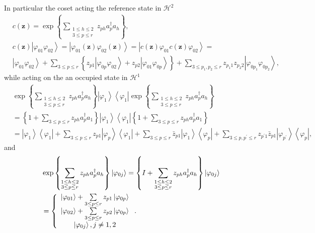 \documentclass[aps,preprint]{revtex4}%
\begin{document}
In particular the coset acting the reference state in $\mathcal{H}^{2}$
\begin{align}
&  c\left(  \mathbf{z}\right)  =\exp\left\{  \sum\limits_{\substack{1\leq
h\leq2\\3\leq p\leq r}}z_{ph}a_{p}^{\dagger}a_{h}\right\}  ,\nonumber\\
&  c\left(  \mathbf{z}\right)  \left\vert \varphi_{01}\varphi_{02}%
\right\rangle =\left\vert \varphi_{01}\left(  \mathbf{z}\right)  \varphi
_{02}\left(  \mathbf{z}\right)  \right\rangle =\left\vert c\left(
\mathbf{z}\right)  \varphi_{01}c\left(  \mathbf{z}\right)  \varphi
_{02}\right\rangle =\nonumber\\
&  \left\vert \varphi_{01}\varphi_{02}\right\rangle +\sum\limits_{3\leq p\leq
r}\left\{  z_{p1}\left\vert \varphi_{0p}\varphi_{02}\right\rangle
+z_{p2}\left\vert \varphi_{01}\varphi_{0p}\right\rangle \right\}
+\sum\limits_{3\leq p_{1},p_{2}\leq r}z_{p_{1}1}z_{p_{2}2}\left\vert
\varphi_{0p_{1}}\varphi_{0p_{2}}\right\rangle ,
\end{align}
while acting on the an occupied state in $\mathcal{H}^{1}$
\begin{align}
&  \exp\left\{  \sum\limits_{\substack{1\leq h\leq2\\3\leq p\leq r}%
}z_{ph}a_{p}^{\dagger}a_{h}\right\}  \left\vert \varphi_{1}\right\rangle
\left\langle \varphi_{1}\right\vert \exp\left\{  \sum\limits_{\substack{1\leq
h\leq2\\3\leq p\leq r}}z_{ph}a_{p}^{\dagger}a_{h}\right\}  \nonumber\\
&  =\left\{  1+\sum\limits_{3\leq p\leq r}z_{ph}a_{p}^{\dagger}a_{1}\right\}
\left\vert \varphi_{1}\right\rangle \left\langle \varphi_{1}\right\vert
\left\{  1+\sum\limits_{3\leq p\leq r}z_{ph}a_{p}^{\dagger}a_{1}\right\}
\nonumber\\
&  =\left\vert \varphi_{1}\right\rangle \left\langle \varphi_{1}\right\vert
+\sum\limits_{3\leq p\leq r}z_{p1}\left\vert \varphi_{p}\right\rangle
\left\langle \varphi_{1}\right\vert +\sum\limits_{3\leq p\leq r}\bar{z}%
_{p1}\left\vert \varphi_{1}\right\rangle \left\langle \varphi_{p}\right\vert
+\sum\limits_{3\leq p,p^{\prime}\leq r}z_{p^{\prime}1}\bar{z}_{p1}\left\vert
\varphi_{p^{\prime}}\right\rangle \left\langle \varphi_{p}\right\vert ,
\end{align}
and
\begin{align}
&  \exp\left\{  \sum\limits_{\substack{1\leq h\leq2\\3\leq p\leq r}%
}z_{ph}a_{p}^{\dagger}a_{h}\right\}  \left\vert \varphi_{0j}\right\rangle
=\left\{  I+\sum\limits_{\substack{1\leq h\leq2\\3\leq p\leq r}}z_{ph}%
a_{p}^{\dagger}a_{h}\right\}  \left\vert \varphi_{0j}\right\rangle \nonumber\\
&  =\left\{
\begin{array}
[c]{c}%
\left\vert \varphi_{01}\right\rangle +\sum\limits_{3\leq p\leq r}%
z_{p1}\left\vert \varphi_{0p}\right\rangle \\
\left\vert \varphi_{02}\right\rangle +\sum\limits_{3\leq p\leq r}%
z_{p2}\left\vert \varphi_{0p}\right\rangle \\
\left\vert \varphi_{0j}\right\rangle ,j\neq1,2
\end{array}
\right.  .
\end{align}
\end{document}
